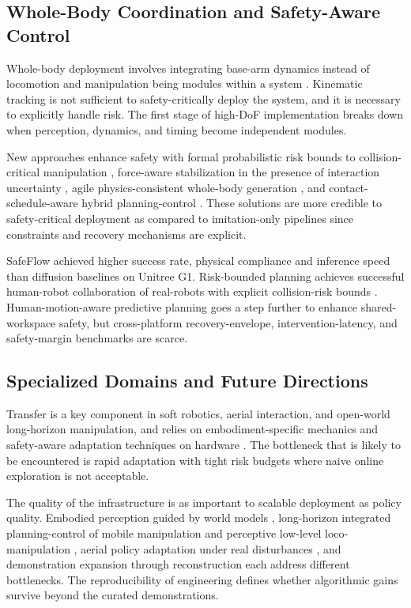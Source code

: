\documentclass[11pt,a4paper]{article}
\begin{document}
\subsection{Whole-Body Coordination and Safety-Aware Control}

Whole-body deployment involves integrating base-arm dynamics instead of locomotion and manipulation being modules within a system \cite{mei2026mobrt,liang2025wholebody,rigo2024hierarchical}. Kinematic tracking is not sufficient to safety-critically deploy the system, and it is necessary to explicitly handle risk. The first stage of high-DoF implementation breaks down when perception, dynamics, and timing become independent modules.

New approaches enhance safety with formal probabilistic risk bounds to collision-critical manipulation \cite{meng2026riskbounded}, force-aware stabilization in the presence of interaction uncertainty \cite{pudasaini2026fame,huang2026steadytray}, agile physics-consistent whole-body generation \cite{zhang2025latent,bao2026phygile}, and contact-schedule-aware hybrid planning-control \cite{patrizi2026rlagmpc}. These solutions are more credible to safety-critical deployment as compared to imitation-only pipelines since constraints and recovery mechanisms are explicit.

SafeFlow achieved higher success rate, physical compliance and inference speed than diffusion baselines on Unitree G1. Risk-bounded planning achieves successful human-robot collaboration of real-robots with explicit collision-risk bounds \cite{cho2026safeflow,meng2026riskbounded}. Human-motion-aware predictive planning goes a step further to enhance shared-workspace safety, but cross-platform recovery-envelope, intervention-latency, and safety-margin benchmarks are scarce.

\subsection{Specialized Domains and Future Directions}

Transfer is a key component in soft robotics, aerial interaction, and open-world long-horizon manipulation, and relies on embodiment-specific mechanics and safety-aware adaptation techniques on hardware \cite{qiu2024swim2real,miyamichi2025flexible,daneshmand2026slowrl}. The bottleneck that is likely to be encountered is rapid adaptation with tight risk budgets where naive online exploration is not acceptable.

The quality of the infrastructure is as important to scalable deployment as policy quality. Embodied perception guided by world models \cite{yin2025womap}, long-horizon integrated planning-control of mobile manipulation and perceptive low-level loco-manipulation \cite{wang2025odyssey,cui2025pilot}, aerial policy adaptation under real disturbances \cite{pan2025learningfly}, and demonstration expansion through reconstruction \cite{yu2025real2render2real} each address different bottlenecks. The reproducibility of engineering defines whether algorithmic gains survive beyond the curated demonstrations.
\end{document}
